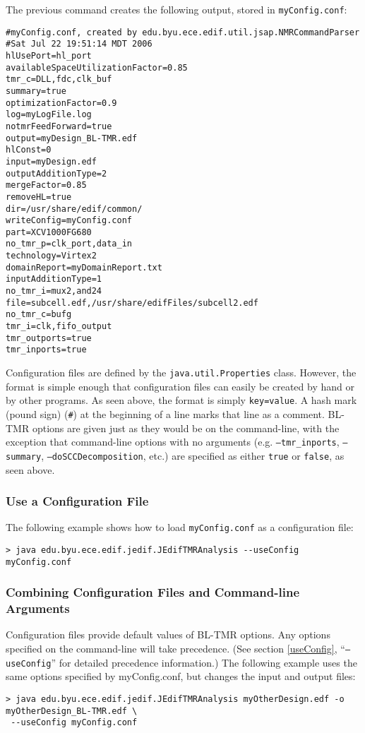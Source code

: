The previous command creates the following output, stored in 
\texttt{myConfig.conf}:

\begin{verbatim}
#myConfig.conf, created by edu.byu.ece.edif.util.jsap.NMRCommandParser
#Sat Jul 22 19:51:14 MDT 2006
hlUsePort=hl_port
availableSpaceUtilizationFactor=0.85
tmr_c=DLL,fdc,clk_buf
summary=true
optimizationFactor=0.9
log=myLogFile.log
notmrFeedForward=true
output=myDesign_BL-TMR.edf
hlConst=0
input=myDesign.edf
outputAdditionType=2
mergeFactor=0.85
removeHL=true
dir=/usr/share/edif/common/
writeConfig=myConfig.conf
part=XCV1000FG680
no_tmr_p=clk_port,data_in
technology=Virtex2
domainReport=myDomainReport.txt
inputAdditionType=1
no_tmr_i=mux2,and24
file=subcell.edf,/usr/share/edifFiles/subcell2.edf
no_tmr_c=bufg
tmr_i=clk,fifo_output
tmr_outports=true
tmr_inports=true
\end{verbatim}

Configuration files are defined by the \texttt{java.util.Properties} class. 
However, the format is simple enough that configuration files can easily be 
created by hand or by other programs. As seen above, the format is simply 
\texttt{key=value}. A hash mark (pound sign) (\texttt{\#}) at the beginning of 
a line marks that line as a comment. BL-TMR options are given just as they would 
be on the command-line, with the exception that command-line options with no 
arguments (e.g. \texttt{--tmr\_inports}, \texttt{--summary}, 
\texttt{--doSCCDecomposition}, etc.) are specified as either \texttt{true} or 
\texttt{false}, as seen above.

\subsubsection{Use a Configuration File}

The following example shows how to load \texttt{myConfig.conf} as a configuration
file:

\begin{verbatim}
> java edu.byu.ece.edif.jedif.JEdifTMRAnalysis --useConfig myConfig.conf
\end{verbatim}

\subsubsection{Combining Configuration Files and Command-line Arguments}
Configuration files provide default values of BL-TMR options. Any options 
specified on the command-line will take precedence. (See section 
\ref{useConfig}, ``\texttt{--useConfig}'' for detailed precedence information.)
The following example uses the same options specified by myConfig.conf, but
changes the input and output files:

\begin{verbatim}
> java edu.byu.ece.edif.jedif.JEdifTMRAnalysis myOtherDesign.edf -o myOtherDesign_BL-TMR.edf \
 --useConfig myConfig.conf
\end{verbatim}

